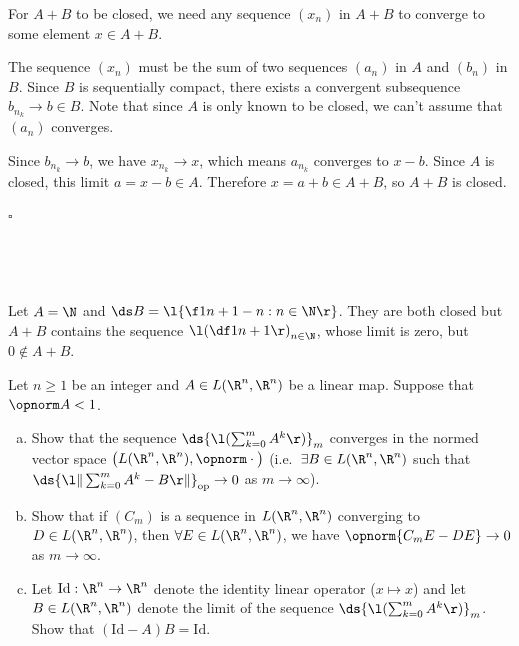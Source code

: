 \documentclass[a4paper]{article}
\begin{document}
For ${A+B}$ to be closed, we need any sequence $(x_n)$ in ${A+B}$ to converge to some element $x \in {A+B}$.

The sequence $(x_n)$ must be the sum of two sequences $(a_n)$ in $A$ and $(b_n)$ in $B$. Since $B$ is sequentially compact, there exists a convergent subsequence $b_{n_k} \to b \in B$. Note that since $A$ is only known to be closed, we can't assume that $(a_n)$ converges.

Since $b_{n_k} \to b$, we have $x_{n_k} \to x$, which means $a_{n_k}$ converges to $x - b$. Since $A$ is closed, this limit $a = x - b \in A$. Therefore $x = a + b \in {A+B}$, so ${A+B}$ is closed.

\hfill $\square$

\subsection{~} %

Let $A = \N$ and $\ds B = \l\{ \f1{n+1} - n : n \in \N \r\}$. They are both closed but $A + B$ contains the sequence ${\l( \df1{n+1} \r)}_{n \in \N}$, whose limit is zero, but $0 \notin {A + B}$.



\begin{questionbody}
Let $n \ge 1$ be an integer and $A \in L(\R^n, \R^n)$ be a linear map. Suppose that $\opnorm A < 1$.
\begin{enumerate}[(a)]
\item Show that the sequence $\ds {\l( \sum_{k=0}^m A^k \r)}_m$ converges in the normed vector space $\big( L(\R^n, \R^n), \opnorm \cdot \big)$ (i.e.\ $\exists B \in L(\R^n, \R^n)$ such that \\
${\ds {\l\| \sum_{k=0}^m A^k - B \r\|}_\mathrm{op} \to 0}$ as $m \to \infty$).

\item Show that if $(C_m)$ is a sequence in $L(\R^n, \R^n)$ converging to $D \in L(\R^n, \R^n)$, then $\forall E \in L(\R^n, \R^n)$, we have $\opnorm{C_m E - D E} \to 0$ as $m \to \infty$.

\item Let $\mathrm{Id} : \R^n \to \R^n$ denote the identity linear operator ($x \mapsto x$) and let $B \in L(\R^n, \R^n)$ denote the limit of the sequence $\ds {\l( \sum_{k=0}^m A^k \r)}_m$. Show that $(\mathrm{Id} - A) B = \mathrm{Id}$.
\end{enumerate}
\end{questionbody}
\end{document}
